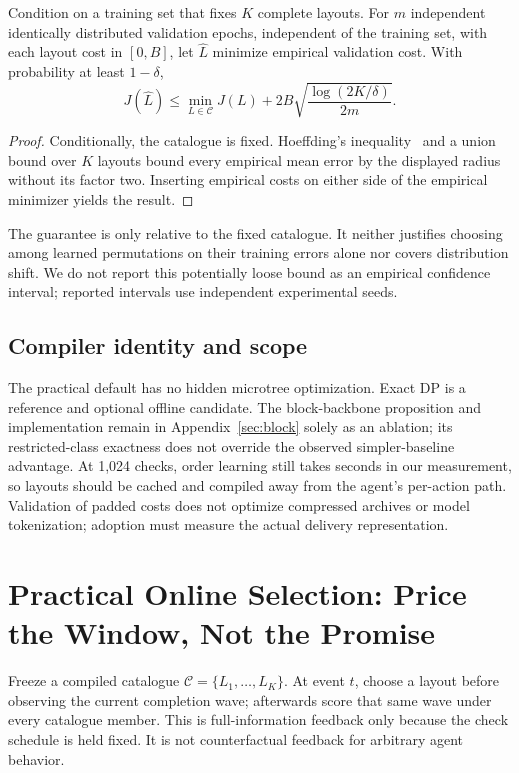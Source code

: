 \documentclass[11pt]{article}
\theoremstyle{definition}\newtheorem{definition}[theorem]{Definition}
\begin{document}
\begin{proposition}\label{prop:validation}
Condition on a training set that fixes $K$ complete layouts. For $m$ independent identically distributed validation epochs, independent of the training set, with each layout cost in $[0,B]$, let $\widehat L$ minimize empirical validation cost. With probability at least $1-\delta$,
\begin{equation}
 J(\widehat L)\le\min_{L\in\mathcal C}J(L)+2B\sqrt{\frac{\log(2K/\delta)}{2m}}.
\end{equation}
\end{proposition}
\begin{proof}
Conditionally, the catalogue is fixed. Hoeffding's inequality~\cite{hoeffding} and a union bound over $K$ layouts bound every empirical mean error by the displayed radius without its factor two. Inserting empirical costs on either side of the empirical minimizer yields the result.\end{proof}
The guarantee is only relative to the fixed catalogue. It neither justifies choosing among learned permutations on their training errors alone nor covers distribution shift. We do not report this potentially loose bound as an empirical confidence interval; reported intervals use independent experimental seeds.

\subsection{Compiler identity and scope}
The practical default has no hidden microtree optimization. Exact DP is a reference and optional offline candidate. The block-backbone proposition and implementation remain in Appendix~\ref{sec:block} solely as an ablation; its restricted-class exactness does not override the observed simpler-baseline advantage. At 1,024 checks, order learning still takes seconds in our measurement, so layouts should be cached and compiled away from the agent's per-action path. Validation of padded costs does not optimize compressed archives or model tokenization; adoption must measure the actual delivery representation.




\section{Practical Online Selection: Price the Window, Not the Promise}\label{sec:online}
Freeze a compiled catalogue $\mathcal C=\{L_1,\ldots,L_K\}$. At event $t$, choose a layout before observing the current completion wave; afterwards score that same wave under every catalogue member. This is full-information feedback only because the check schedule is held fixed. It is not counterfactual feedback for arbitrary agent behavior.
\end{document}
